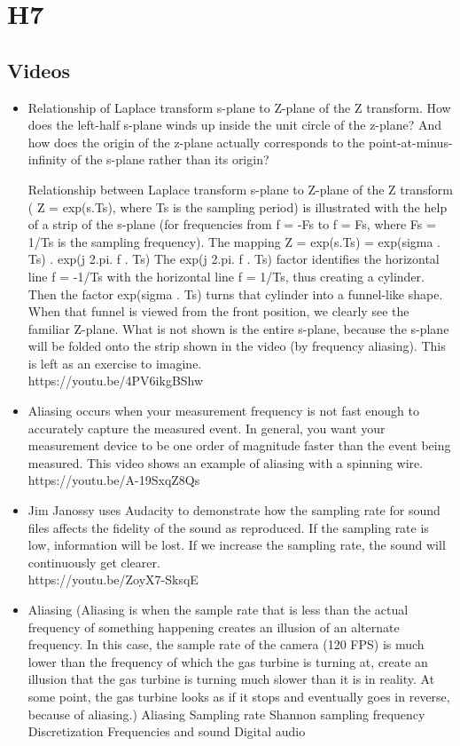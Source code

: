 \documentclass{document}
\begin{document}
	\section{H7}
	\subsection{Videos}
	\begin{itemize}
		\item Relationship of Laplace transform s-plane to Z-plane of the Z transform.
		How does the left-half s-plane winds up inside the unit circle of the z-plane? And how does the origin of the z-plane actually corresponds to the point-at-minus-infinity of the s-plane rather than its origin?
		
		Relationship between Laplace transform s-plane to Z-plane of the Z transform ( Z = exp(s.Ts), where Ts is the sampling period) is illustrated with the help of a strip of the s-plane (for frequencies from f = -Fs to f = Fs, where Fs = 1/Ts is the sampling frequency).
		The mapping Z = exp(s.Ts) = exp(sigma . Ts) . exp(j 2.pi. f . Ts)
		The exp(j 2.pi. f . Ts) factor identifies the horizontal line f = -1/Ts with the horizontal line f = 1/Ts, thus creating a cylinder. Then the factor exp(sigma . Ts) turns that cylinder into a funnel-like shape. When that funnel is viewed from the front position, we clearly see the familiar Z-plane.
		What is not shown is the entire s-plane, because the s-plane will be folded onto the strip shown in the video (by frequency aliasing). This is left as an exercise to imagine.\\
		https://youtu.be/4PV6ikgBShw
		\item Aliasing occurs when your measurement frequency is not fast enough to accurately capture the measured event. In general, you want your measurement device to be one order of magnitude faster than the event being measured.
		This video shows an example of aliasing with a spinning wire.\\
		https://youtu.be/A-19SxqZ8Qs
		\item Jim Janossy uses Audacity to demonstrate how the sampling rate for sound files affects the fidelity of the sound as reproduced. 
		If the sampling rate is low, information will be lost. If we increase the sampling rate, the sound will continuously get clearer. \\
		https://youtu.be/ZoyX7-SksqE
		\item Aliasing
		(Aliasing is when the sample rate that is less than the actual frequency of something happening creates an illusion of an alternate frequency. In this case, the sample rate of the camera (120 FPS) is much lower than the frequency of which the gas turbine is turning at, create an illusion that the gas turbine is turning much slower than it is in reality. At some point, the gas turbine looks as if it stops and eventually goes in reverse, because of aliasing.)
		Aliasing
		Sampling rate
		Shannon sampling frequency
		Discretization
		Frequencies and sound
		Digital audio
	\end{itemize}
\end{document}
